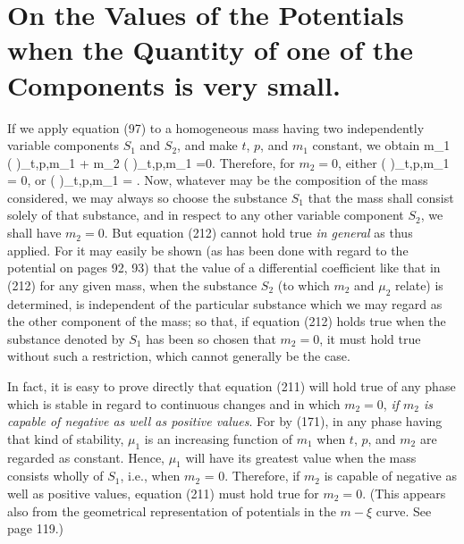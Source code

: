 \documentclass[12pt]{article}
\begin{document}
\section{On the Values of the Potentials when the Quantity of one of the Components is very small.}
If we apply equation (97) to a homogeneous mass having two independently variable components $S_1$ and $S_2$, and make $t$, $p$, and $m_1$ constant, we obtain
\eqs m_1 \left(  \right)_{t,p,m_1} + m_2 \left(  \right)_{t,p,m_1} =0. \label{210}\eqe
Therefore, for $m_2 = 0$, either
\eqs \left(  \right)_{t,p,m_1} = 0,  \label{211}\eqe
or    \eqs  \left(  \right)_{t,p,m_1} = \infty . \label{212}\eqe
Now, whatever may be the composition of the mass considered, we may always so choose the substance $S_1$ that the mass shall consist solely of that substance, and in respect to any other variable component $S_2$, we shall have $m_2=0$. But equation (212) cannot hold true \textit{in general} as thus applied. For it may easily be shown (as has been done with regard to the potential on pages 92, 93) that the value of a differential coefficient like that in (212) for any given mass, when the substance $S_2$ (to which $m_2$ and $\mu_2$ relate) is determined, is independent of the particular substance which we may regard as the other component of the mass; so that, if equation (212) holds true when the substance denoted by $S_1$ has been so chosen that $m_2=0$, it must hold true without such a restriction, which cannot generally be the case.


In fact, it is easy to prove directly that equation (211) will hold true of any phase which is stable in regard to continuous changes and in which $m_2 = 0$, \textit{if $m_2$ is capable of negative as well as positive values}. For by (171), in any phase having that kind of stability, $\mu_1$ is an increasing function of $m_1$ when $t$, $p$, and $m_2$ are regarded as constant. Hence, $\mu_1$ will have its greatest value when the mass consists wholly of $S_1$, i.e., when $m_2$ = 0. Therefore, if $m_2$ is capable of negative as well as positive values, equation (211) must hold true for $m_2=0$. (This appears also from the geometrical representation of potentials in the $m\!-\xi$ curve. See page 119.)
\end{document}

